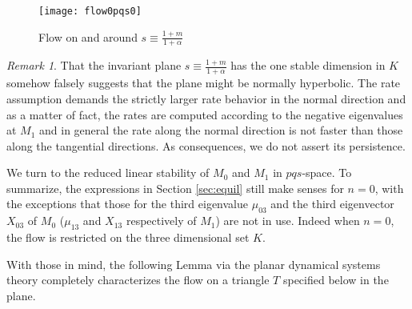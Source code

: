 \documentclass[a4paper,11pt]{article}
\theoremstyle{remark}
\newtheorem{remark}{Remark}[section]
\begin{document}
\begin{figure}[ht] 
 \centering
 \texttt{[image: flow0pqs0]} 
 \caption{Flow on and around $s\equiv\tfrac{1+m}{1+ \alpha}$} \label{fig:n0pqs}
\end{figure}

\begin{remark}
That the invariant plane $s\equiv\tfrac{1+m}{1+ \alpha}$ has the one stable dimension in $K$ somehow falsely suggests that the plane might be normally hyperbolic. The rate assumption demands the strictly larger rate behavior in the normal direction and as a matter of fact, the rates are computed according to the negative eigenvalues at $M_1$ and in general the rate along the normal direction is not faster than those along the tangential directions. As consequences, we do not assert its persistence. 
\end{remark}

We turn to the reduced linear stability of $M_0$ and $M_1$ in $pqs$-space. To summarize, the expressions in Section \ref{sec:equil} still make senses for $n=0$, with the exceptions that those for the third eigenvalue $\mu_{03}$ and the third eigenvector $X_{03}$ of $M_0$ ($\mu_{13}$ and $X_{13}$ respectively of $M_1$) are not in use. Indeed when $n=0$, the flow is restricted on the three dimensional set $K$. %

With those in mind, the following Lemma via the planar dynamical systems theory completely characterizes the flow on a triangle $T$ specified below in the plane. %
\end{document}
